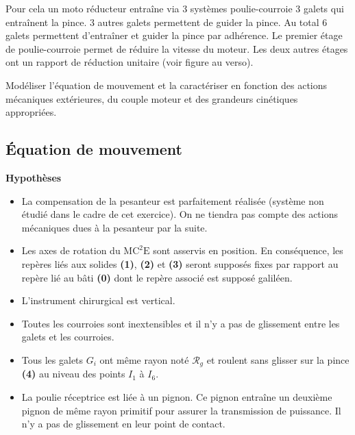\documentclass[10pt,fleqn]{article} %
\begin{document}
\begin{multicols}{2}
Pour cela un moto réducteur entraîne via 3 systèmes poulie-courroie 3 galets qui entraînent la pince. 3 autres galets permettent de guider la pince. Au total 6 galets permettent d'entraîner et guider la pince par adhérence. Le premier étage de poulie-courroie permet de réduire la vitesse du moteur. Les deux autres étages ont un rapport de réduction unitaire (voir figure au verso). 
\fi



\begin{obj}
Modéliser l’équation de mouvement et la caractériser en fonction des actions mécaniques extérieures, du couple moteur et des grandeurs cinétiques appropriées.
\end{obj}




\subsection*{Équation de mouvement}


\ifprof
\else
\textbf{Hypothèses}
\begin{itemize}
\item La compensation de la pesanteur est parfaitement réalisée (système non étudié dans le cadre de cet exercice). On ne tiendra pas compte des actions mécaniques dues à la pesanteur par la suite.
\item Les axes de rotation du $\text{MC}^2\text{E}$ sont asservis en position. En conséquence, les repères liés aux solides \textbf{(1)}, \textbf{(2)} et \textbf{(3)} seront supposés fixes par rapport au repère lié au bâti \textbf{(0)} dont le repère associé est supposé galiléen.
\item L’instrument chirurgical est vertical.
\item Toutes les courroies sont inextensibles et il n’y a pas de glissement entre les galets et les courroies.
\item Tous les galets $G_i$ ont même rayon noté $\mathcal{R}_g$ et roulent sans glisser sur la pince \textbf{(4)} au niveau des points $I_1$ à $I_6$.
\item La poulie réceptrice est liée à un pignon. Ce pignon entraîne un deuxième pignon de même rayon primitif pour assurer la transmission de puissance. Il n’y a pas de glissement en leur point de contact.
\end{itemize}


\end{multicols}
\end{document}
